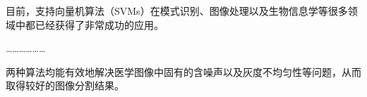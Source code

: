 目前，支持向量机算法（SVMs）在模式识别、图像处理以及生物信息学等很多领域中都已经获得了非常成功的应用。

………………

两种算法均能有效地解决医学图像中固有的含噪声以及灰度不均匀性等问题，从而取得较好的图像分割结果。
